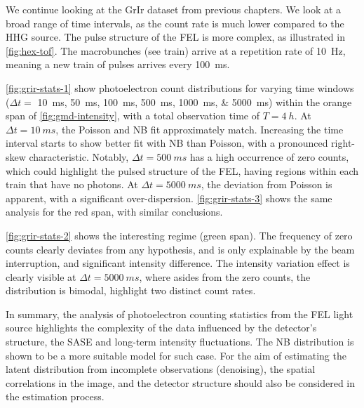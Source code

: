 We continue looking at the \gls{GrIr} dataset from previous chapters. We look at a broad range of time intervals, as the count rate is much lower compared to the \gls{HHG} source. The pulse structure of the \gls{FEL} is more complex, as illustrated in \cref{fig:hex-tof}. The macrobunches (see \gls{train}) arrive at a repetition rate of \qty{10}{Hz}, meaning a new train of \glspl{pulse} arrives every \qty{100}{ms}.


\cref{fig:grir-stats-1} show photoelectron count distributions for varying time windows ($\Delta t =$ \qtylist{10;50;100;500;1000;5000}{ms}) within the orange span of \cref{fig:gmd-intensity}, with a total observation time of $T=\qty{4}{h}$. At $\Delta t = \qty{10}{ms}$, the Poisson and \gls{NB} fit approximately match. Increasing the time interval starts to show better fit with \gls{NB} than Poisson, with a pronounced right-skew characteristic. Notably, $\Delta t = \qty{500}{ms}$ has a high occurrence of zero counts, which could highlight the pulsed structure of the \gls{FEL}, having regions within each train that have no photons. At $\Delta t = \qty{5000}{ms}$, the deviation from Poisson is apparent, with a significant over-dispersion. \cref{fig:grir-stats-3} shows the same analysis for the red span, with similar conclusions.

\cref{fig:grir-stats-2} shows the interesting regime (green span). The frequency of zero counts clearly deviates from any hypothesis, and is only explainable by the beam interruption, and significant intensity difference. The intensity variation effect is clearly visible at $\Delta t = \qty{5000}{ms}$, where asides from the zero counts, the distribution is bimodal, highlight two distinct count rates.

In summary, the analysis of photoelectron counting statistics from the \gls{FEL} light source highlights the complexity of the data influenced by the detector’s structure, the \gls{SASE} and long-term intensity fluctuations. The \gls{NB} distribution is shown to be a more suitable model for such case. For the aim of estimating the latent distribution from incomplete observations (denoising), the spatial correlations in the image, and the detector structure should also be considered in the estimation process. 


